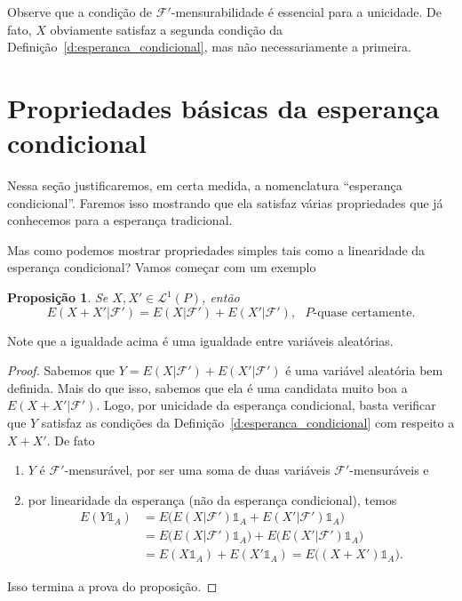 \documentclass[reqno, final]{book}
\newcommand*\1{\mathds{1}}
\newtheorem{proposition}[theorem]{Proposição}
\begin{document}
Observe que a condição de $\mathcal{F}'$-mensurabilidade é essencial para a unicidade.
De fato, $X$ obviamente satisfaz a segunda condição da Definição~\ref{d:esperanca_condicional}, mas não necessariamente a primeira.

\section{Propriedades básicas da esperança condicional}

Nessa seção justificaremos, em certa medida, a nomenclatura ``esperança condicional''.
Faremos isso mostrando que ela satisfaz várias propriedades que já conhecemos para a esperança tradicional.

Mas como podemos mostrar propriedades simples tais como a linearidade da esperança condicional?
Vamos começar com um exemplo

\begin{proposition}
  Se $X, X' \in \mathcal{L}^1(P)$, então
  \begin{equation}
    E(X + X'|\mathcal{F}') = E(X|\mathcal{F}') + E(X'|\mathcal{F}'), \text{ $P$-quase certamente.}
  \end{equation}
\end{proposition}

Note que a igualdade acima é uma igualdade entre variáveis aleatórias.

\begin{proof}
  Sabemos que $Y = E(X|\mathcal{F}') + E(X'|\mathcal{F}')$ é uma variável aleatória bem definida.
  Mais do que isso, sabemos que ela é uma candidata muito boa a $E(X + X'|\mathcal{F}')$.
  Logo, por unicidade da esperança condicional, basta verificar que $Y$ satisfaz as condições da Definição~\ref{d:esperanca_condicional} com respeito a $X + X'$.
  De fato
  \begin{enumerate}[\quad a)]
  \item $Y$ é $\mathcal{F}'$-mensurável, por ser uma soma de duas variáveis $\mathcal{F}'$-mensuráveis e
  \item por linearidade da esperança (não da esperança condicional), temos
    \begin{equation}
      \begin{split}
        E(Y \1_A) & = E\big( E(X|\mathcal{F}')\1_A + E(X'|\mathcal{F}')\1_A \big)\\
        & = E\big( E(X|\mathcal{F}')\1_A\big) + E\big(E(X'|\mathcal{F}')\1_A \big)\\
        & = E(X \1_A) + E(X' \1_A) = E\big( (X + X') \1_A \big).
      \end{split}
    \end{equation}
  \end{enumerate}
  Isso termina a prova do proposição.
\end{proof}
\end{document}
